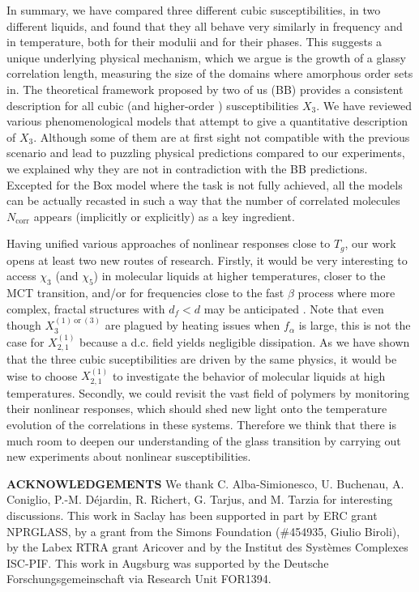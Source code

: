 \documentclass[single column,pre]{revtex4}
\begin{document}
In summary, we have compared three different cubic susceptibilities, in two different liquids, and found that they all behave very similarly in frequency and in 
temperature, both for their modulii and for their phases. This suggests a unique underlying physical mechanism, which we argue is the growth of a glassy correlation length, measuring the size of the domains where amorphous order sets in. The theoretical framework proposed by two of us \cite{Bou05} (BB) provides a consistent description for all cubic (and higher-order \cite{Alb16})
susceptibilities $X_3$. We have reviewed various phenomenological models that attempt to give a quantitative description of $X_3$. Although some of them are at first sight not compatible with the previous scenario 
and lead to puzzling physical predictions compared to our experiments, we explained 
why they are not in contradiction with the BB predictions. Excepted for the Box model where the task is not fully achieved, all the models can be actually recasted in such a way that the number of correlated molecules $N_{\text{corr}}$ appears (implicitly or explicitly) as a key ingredient. 

Having unified various approaches of nonlinear responses close to $T_g$, our work opens at least two new routes of research. Firstly, 
it would be very interesting to access $\chi_3$ (and $\chi_5$) in molecular liquids at higher temperatures, closer to the MCT transition, and/or for frequencies close to the fast $\beta$ process 
where more complex, fractal structures with $d_f<d$ may be anticipated \cite{IMCT,WolynesSchmalian}. Note that even though $X_{3}^{(1)\ \mathrm{or}\ (3)}$ are plagued by heating issues when  $f_{\alpha}$ is large, this is not the case for $X_{2,1}^{(1)}$ because a d.c. field yields negligible dissipation. As we have shown that the three cubic suceptibilities are driven by the same physics, it would be wise to choose $X_{2,1}^{(1)}$ to investigate the behavior of molecular liquids at high temperatures. Secondly, we could revisit the vast field of polymers by monitoring their nonlinear responses, which should shed new light onto the temperature evolution of the correlations in these systems. Therefore we think that there is much room to deepen our understanding of the glass transition by carrying out new experiments about nonlinear susceptibilities. 

\vskip 0.5cm

{\bf{ACKNOWLEDGEMENTS}}
We thank C. Alba-Simionesco, U. Buchenau, A. Coniglio, P.-M. D\'ejardin, R. Richert, G. Tarjus, and M. Tarzia for interesting discussions. This work in Saclay has been supported in part by ERC grant NPRGLASS, by a grant from the Simons Foundation (\#454935, Giulio Biroli), by the Labex RTRA grant Aricover and by the Institut des Syst\`emes Complexes ISC-PIF. This work in Augsburg was supported by the Deutsche Forschungsgemeinschaft via Research Unit FOR1394.
\end{document}
